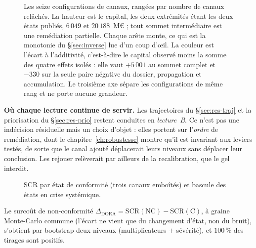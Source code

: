 \begin{figure}[htbp]\centering
{}
\caption{Les seize configurations de canaux, rangées par nombre de canaux relâchés. La hauteur
est le capital, les deux extrémités étant les deux états publiés, $6\,049$ et $20\,188$~M\euro{} ;
tout sommet intermédiaire est une remédiation partielle. Chaque arête monte, ce qui est la
monotonie du \S\ref{sec:inverse} lue d'un coup d'\oe{}il. La couleur est l'écart à l'additivité,
c'est-à-dire le capital observé moins la somme des quatre effets isolés : elle vaut $+5\,001$ au
sommet complet et $-330$ sur la seule paire négative du dossier, propagation et accumulation. Le
troisième axe sépare les configurations de même rang et ne porte aucune grandeur.}
\label{fig:treillis-canaux}
\end{figure}

\noindent\textbf{Où chaque lecture continue de servir.} Les trajectoires du
\S\ref{sec:res-traj} et la priorisation du \S\ref{sec:res-prio} restent conduites en
\emph{lecture~B}. Ce n'est pas une indécision résiduelle mais un choix d'objet : elles portent
sur l'\emph{ordre} de remédiation, dont le chapitre~\ref{ch:robustesse} montre qu'il est
invariant aux leviers testés, de sorte que le canal ajouté déplacerait leurs niveaux sans
déplacer leur conclusion. Les rejouer relèverait par ailleurs de la recalibration, que le gel
interdit.

\begin{figure}[H]\centering
{}
\caption{SCR par état de conformité (trois canaux emboîtés) et bascule des états en crise
systémique.}
\label{fig:multietats}
\end{figure}

Le surcoût de non-conformité $\Delta_{\text{DORA}}=\mathrm{SCR}(\text{NC})-\mathrm{SCR}(\text{C})$,
à graine Monte-Carlo commune (l'écart ne vient que du changement d'état, non du bruit),
s'obtient par bootstrap deux niveaux (multiplicateurs $+$ sévérité), et $100\,\%$ des tirages
sont positifs.

